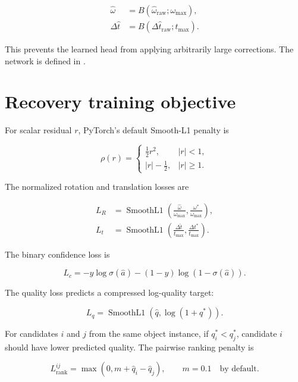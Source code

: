 \documentclass[11pt]{article}
\newcommand{\SmoothLone}{\operatorname{SmoothL1}}
\begin{document}
\begin{align}
\widehat\omega&=B(\widehat\omega_{\mathrm{raw}};\omega_{\max}),\\
\Delta\widehat t&=B(\Delta\widehat t_{\mathrm{raw}};t_{\max}).
\end{align}

This prevents the learned head from applying arbitrarily large corrections.
The network is defined in .

\section{Recovery training objective}

For scalar residual $r$, PyTorch's default Smooth-L1 penalty is

\begin{equation}
\rho(r)=
\begin{cases}
\frac12r^2, & |r|<1,\\
|r|-\frac12, & |r|\ge1.
\end{cases}
\end{equation}

The normalized rotation and translation losses are

\begin{align}
L_R&=\SmoothLone\left(
\frac{\widehat\omega}{\omega_{\max}},
\frac{\omega^*}{\omega_{\max}}
\right),\\
L_t&=\SmoothLone\left(
\frac{\Delta\widehat t}{t_{\max}},
\frac{\Delta t^*}{t_{\max}}
\right).
\end{align}

The binary confidence loss is

\begin{equation}
L_c=-y\log\sigma(\widehat a)
-(1-y)\log\left(1-\sigma(\widehat a)\right).
\end{equation}

The quality loss predicts a compressed log-quality target:

\begin{equation}
L_q=\SmoothLone\left(\widehat q,\log(1+q^*)\right).
\end{equation}

For candidates $i$ and $j$ from the same object instance, if
$q_i^*<q_j^*$, candidate $i$ should have lower predicted quality. The pairwise
ranking penalty is

\begin{equation}
L_{\mathrm{rank}}^{ij}
=\max\left(0,m+\widehat q_i-\widehat q_j\right),
\qquad m=0.1\quad\text{by default}.
\end{equation}
\end{document}
